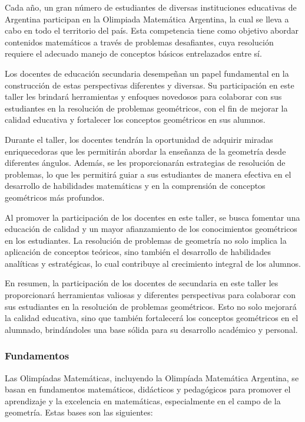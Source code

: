 Cada año, un gran número de estudiantes de diversas instituciones educativas de Argentina participan en la Olimpiada Matemática Argentina, la cual se lleva a cabo en todo el territorio del país. Esta competencia tiene como objetivo abordar contenidos matemáticos a través de problemas desafiantes, cuya resolución requiere el adecuado manejo de conceptos básicos entrelazados entre sí. 

Los docentes de educación secundaria desempeñan un papel fundamental en la construcción de estas perspectivas diferentes y diversas. Su participación en este taller les brindará herramientas y enfoques novedosos para colaborar con sus estudiantes en la resolución de problemas geométricos, con el fin de mejorar la calidad educativa y fortalecer los conceptos geométricos en sus alumnos.

Durante el taller, los docentes tendrán la oportunidad de adquirir miradas enriquecedoras que les permitirán abordar la enseñanza de la geometría desde diferentes ángulos. Además, se les proporcionarán estrategias de resolución de problemas, lo que les permitirá guiar a sus estudiantes de manera efectiva en el desarrollo de habilidades matemáticas y en la comprensión de conceptos geométricos más profundos.

Al promover la participación de los docentes en este taller, se busca fomentar una educación de calidad y un mayor afianzamiento de los conocimientos geométricos en los estudiantes. La resolución de problemas de geometría no solo implica la aplicación de conceptos teóricos, sino también el desarrollo de habilidades analíticas y estratégicas, lo cual contribuye al crecimiento integral de los alumnos.

En resumen, la participación de los docentes de secundaria en este taller les proporcionará herramientas valiosas y diferentes perspectivas para colaborar con sus estudiantes en la resolución de problemas geométricos. Esto no solo mejorará la calidad educativa, sino que también fortalecerá los conceptos geométricos en el alumnado, brindándoles una base sólida para su desarrollo académico y personal.

\subsubsection{Fundamentos}

Las Olimpíadas Matemáticas, incluyendo la Olimpíada Matemática Argentina, se basan en fundamentos matemáticos, didácticos y pedagógicos para promover el aprendizaje y la excelencia en matemáticas, especialmente en el campo de la geometría. Estas bases son las siguientes:


